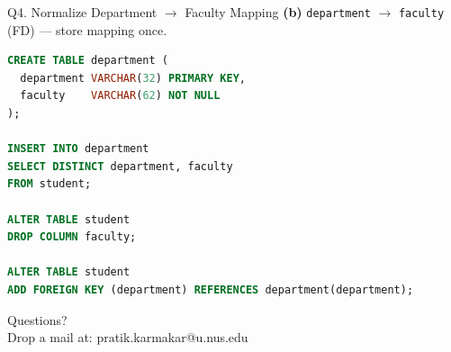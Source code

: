 \documentclass{beamer}
\begin{document}
\begin{frame}[fragile]{Q4. Normalize Department \texorpdfstring{$\to$}{->} Faculty Mapping}
\textbf{(b)} \texttt{department} $\to$ \texttt{faculty} (FD) — store mapping once.
\begin{lstlisting}[language=SQL]
CREATE TABLE department (
  department VARCHAR(32) PRIMARY KEY,
  faculty    VARCHAR(62) NOT NULL
);

INSERT INTO department
SELECT DISTINCT department, faculty
FROM student;

ALTER TABLE student
DROP COLUMN faculty;

ALTER TABLE student
ADD FOREIGN KEY (department) REFERENCES department(department);
\end{lstlisting}
\end{frame}

\begin{frame}
\begin{center}
Questions?\\
Drop a mail at: pratik.karmakar@u.nus.edu
\end{center}
\end{frame}
\end{document}
